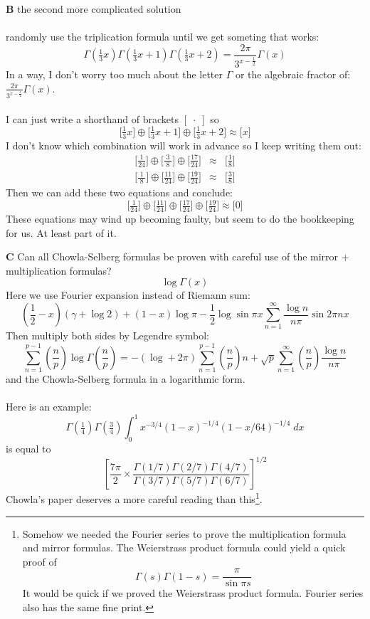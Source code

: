 \documentclass[12pt]{article}
\begin{document}
\newpage

\noindent \textbf{B} the second more complicated solution \\ \\
randomly use the triplication formula until we get someting that works:
$$ \Gamma(\tfrac{1}{3}x)
 \Gamma(\tfrac{1}{3}x+1)
  \Gamma(\tfrac{1}{3}x+2)
  = \frac{2\pi}{3^{x - \frac{1}{2}}}\Gamma(x) $$
In a way, I don't worry too much about the letter $\Gamma$ or the algebraic fractor of: $\frac{2\pi}{3^{x - \frac{1}{2}}}\Gamma(x) $.  \\ \\ 
I can just write a shorthand of brackets $[ \;\cdot \;] $ so
$$ 
\Big[\tfrac{1}{3}x \Big]\oplus 
\Big[\tfrac{1}{3}x +1 \Big]\oplus 
\Big[ \tfrac{1}{3}x + 2 \Big]
\approx \big[ x \big]
 $$
 \newpage
\noindent I don't know which combination will work in advance so I keep writing them out:
 \begin{eqnarray}
\Big[\tfrac{1}{24} \Big]\oplus 
\Big[\tfrac{3}{\;8\;}\Big]\oplus 
\Big[\tfrac{17}{24} \Big]
&\approx& \Big[ \tfrac{1}{8} \Big] \\
\Big[\tfrac{1}{\;8\;} \Big]\oplus 
\Big[\tfrac{11}{24}\Big]\oplus 
\Big[\tfrac{19}{24} \Big]
&\approx& \Big[ \tfrac{3}{8} \Big] 
 \end{eqnarray}
 Then we can add these two equations and conclude:
$$
\Big[\tfrac{1}{24} \Big]\oplus 
\Big[\tfrac{11}{24}\Big]\oplus 
\Big[\tfrac{17}{24} \Big] \oplus
\Big[\tfrac{19}{24} \Big]
 \approx  \big[0\big]$$
These equations may wind up becoming faulty, but seem to do the bookkeeping for us.  At least part of it.
\newpage

\noindent \textbf{C} Can all Chowla-Selberg formulas be proven with careful use of the mirror + multiplication formulas?
$$ 
\log \Gamma(x) $$ 
Here we use Fourier expansion instead of Riemann sum:
$$
\left( \frac{1}{2}-x\right)(\gamma + \log 2)
+ (1-x)\log \pi - \frac{1}{2} \log \sin \pi x
 \sum_{n=1}^\infty \frac{\log n}{n\pi}\sin 2 \pi n x
$$
Then multiply both sides by Legendre symbol:
$$
\sum_{n=1}^{p-1} \left(\frac{n}{p} \right)
\log \Gamma \left(\frac{n}{p} \right)
= - (\log + 2\pi ) \sum_{n=1}^{p-1} \left(\frac{n}{p} \right) n
+ \sqrt{p} \sum_{n=1}^\infty \left(\frac{n}{p} \right) \frac{\log n }{n \pi}
 $$
 and the Chowla-Selberg formula in a logarithmic form. \\ \\ 
 Here is an example:
$$  \Gamma(\tfrac{1}{4}) \Gamma(\tfrac{3}{4})\int_0^1  x^{-3/4}(1-x)^{-1/4}(1 - x/64)^{-1/4} \; dx $$
is equal to
$$ \left[  \frac{7\pi}{2} \times 
\frac{ \Gamma(1/7)\Gamma(2/7)\Gamma(4/7)}{
\Gamma(3/7)\Gamma(5/7)\Gamma(6/7)}
 \right]^{1/2}$$
Chowla's paper deserves a more careful reading than this\footnote{Somehow we needed the Fourier series to prove the multiplication formula and mirror formulas.  The Weierstrass product formula could yield a quick proof of $$ \Gamma(s) \Gamma(1-s) = \frac{\pi}{\sin \pi s} $$ It would be quick if we proved the Weierstrass product formula.  Fourier series also has the same fine print.}. 
\end{document}
